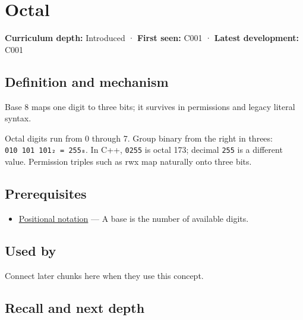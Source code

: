 \hypertarget{appendix-17fc1bc8b305}{}\label{referencestart:appendix-17fc1bc8b305}
\section{Octal}\label{appendix-17fc1bc8b305-octal}

\textbf{Curriculum depth:} Introduced · \textbf{First seen:} C001 · \textbf{Latest development:} C001

\begin{allmightroledefinition}

\subsection{Definition and mechanism}\label{appendix-17fc1bc8b305-definition-and-mechanism}

Base 8 maps one digit to three bits; it survives in permissions and legacy literal syntax.

\end{allmightroledefinition}

Octal digits run from 0 through 7. Group binary from the right in threes: \texttt{010\ 101\ 101₂\ =\ 255₈}. In C++, \texttt{0255} is octal 173; decimal \texttt{255} is a different value. Permission triples such as rwx map naturally onto three bits.

\subsection{Prerequisites}\label{appendix-17fc1bc8b305-prerequisites}

\begin{itemize}
\tightlist
\item
  \hyperref[appendix-83c3f28f7bda]{Positional notation} --- A base is the number of available digits.
\end{itemize}

\subsection{Used by}\label{appendix-17fc1bc8b305-used-by}

Connect later chunks here when they use this concept.

\subsection{Recall and next depth}\label{appendix-17fc1bc8b305-recall-and-next-depth}

